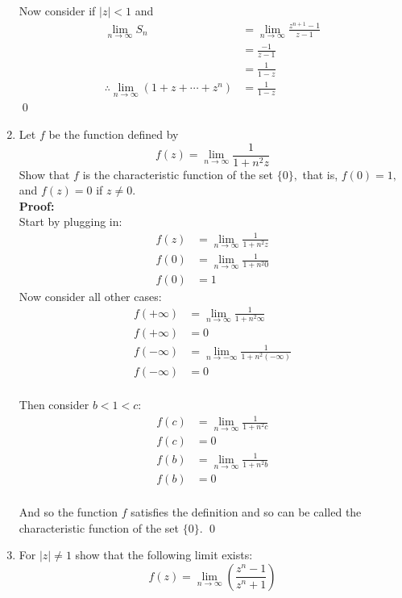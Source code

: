 \begin{enumerate}
	Now consider if $|z| < 1$ and 
	\begin{align*}
		\lim_{n \to \infty} S_n &= \lim_{n \to \infty} \frac{z^{n +1} - 1}{z - 1} \\
		&=  \frac{- 1}{z - 1} \\
		&=  \frac{1}{1 - z} \\
		\therefore \lim_{n \to \infty} (1 + z + \cdots + z^n ) &= \frac{1}{1 - z}
	\end{align*}
	\qed

	\item Let $f$ be the function defined by
	\[ f(z) = \lim_{n \to \infty} \frac{1}{1 + n^2 z} \]
	Show that $f$ is the characteristic function of the set $\{0\},$ that is, $f(0) = 1,$ and $f(z) = 0$ if $z \neq 0.$ \\
			
	\textbf{Proof:} \\

	Start by plugging in:
	\begin{align*}
		f(z) &= \lim_{n \to \infty} \frac{1}{1 + n^2 z} \\
		f(0) &= \lim_{n \to \infty} \frac{1}{1 + n^2 0} \\
		f(0) &= 1 
	\end{align*}
	Now consider all other cases:
	\begin{align*}
		f(+\infty) &= \lim_{n \to \infty} \frac{1}{1 + n^2 \infty} \\
		f(+\infty) &= 0 \\
		f(-\infty) &= \lim_{n \to -\infty} \frac{1}{1 + n^2 (-\infty)} \\ 
		f(-\infty) &= 0 \\
	\end{align*}

	Then consider $b < 1 < c$:
	\begin{align*}
		f(c) &= \lim_{n \to \infty} \frac{1}{1 + n^2 c} \\
		f(c) &= 0 \\
		f(b) &= \lim_{n \to \infty} \frac{1}{1 + n^2 b} \\ 
		f(b) &= 0 \\
	\end{align*}

	And so the function $f$ satisfies the definition and so can be called the characteristic function of the set $\{0\}$.
	\qed

	\item For $|z| \neq 1$ show that the following limit exists:
	\[ f(z) = \lim_{n \to \infty} \left( \frac{z^n - 1}{z^n + 1} \right) \]


\end{enumerate}

